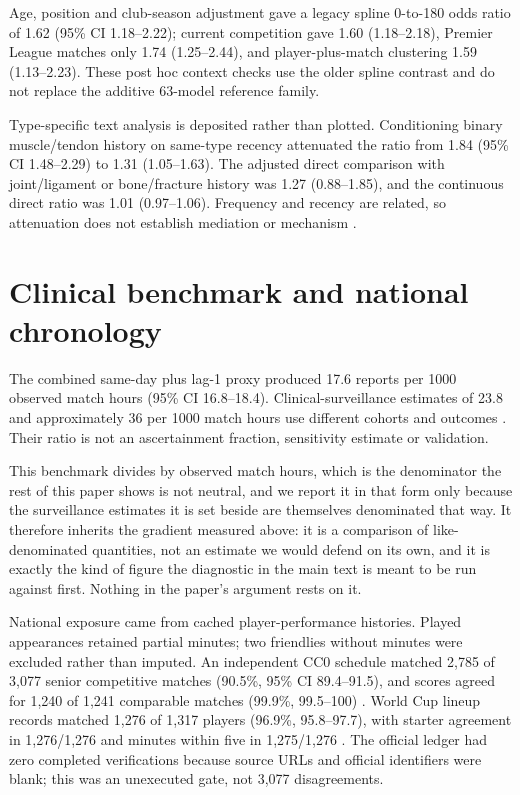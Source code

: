 \documentclass[11pt]{article}
\begin{document}
Age, position and club-season adjustment gave a legacy spline 0-to-180 odds ratio of 1.62 (95\% CI 1.18--2.22); current competition gave 1.60 (1.18--2.18), Premier League matches only 1.74 (1.25--2.44), and player-plus-match clustering 1.59 (1.13--2.23). These post hoc context checks use the older spline contrast and do not replace the additive 63-model reference family.

Type-specific text analysis is deposited rather than plotted. Conditioning binary muscle/tendon history on same-type recency attenuated the ratio from 1.84 (95\% CI 1.48--2.29) to 1.31 (1.05--1.63). The adjusted direct comparison with joint/ligament or bone/fracture history was 1.27 (0.88--1.85), and the continuous direct ratio was 1.01 (0.97--1.06). Frequency and recency are related, so attenuation does not establish mediation or mechanism \cite{westreich2013_table2_fallacy,bennette2012_dichotomizing}.

\section{Clinical benchmark and national chronology}

The combined same-day plus lag-1 proxy produced 17.6 reports per 1000 observed match hours (95\% CI 16.8--18.4). Clinical-surveillance estimates of 23.8 and approximately 36 per 1000 match hours use different cohorts and outcomes \cite{ekstrand2021injury_rates_decreased,denhollander2025imc_position}. Their ratio is not an ascertainment fraction, sensitivity estimate or validation.

This benchmark divides by observed match hours, which is the denominator the rest of this paper shows is not neutral, and we report it in that form only because the surveillance estimates it is set beside are themselves denominated that way. It therefore inherits the gradient measured above: it is a comparison of like-denominated quantities, not an estimate we would defend on its own, and it is exactly the kind of figure the diagnostic in the main text is meant to be run against first. Nothing in the paper's argument rests on it.

National exposure came from cached player-performance histories. Played appearances retained partial minutes; two friendlies without minutes were excluded rather than imputed. An independent CC0 schedule matched 2,785 of 3,077 senior competitive matches (90.5\%, 95\% CI 89.4--91.5), and scores agreed for 1,240 of 1,241 comparable matches (99.9\%, 99.5--100) \cite{martj_international_results}. World Cup lineup records matched 1,276 of 1,317 players (96.9\%, 95.8--97.7), with starter agreement in 1,276/1,276 and minutes within five in 1,275/1,276 \cite{openfootball_worldcup_more}. The official ledger had zero completed verifications because source URLs and official identifiers were blank; this was an unexecuted gate, not 3,077 disagreements.
\end{document}
